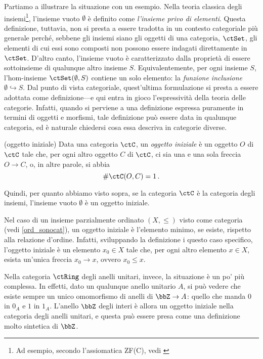 \Todo{}
Partiamo a illustrare la situazione con un esempio. Nella teoria classica degli insiemi\footnote{Ad esempio, secondo l'assiomatica ZF(C), vedi \cite{ZFC}}, l'insieme vuoto \(\emptyset\) è definito come \emph{l'insieme privo di elementi}. Questa definizione, tuttavia, non si presta a essere tradotta in un contesto categoriale più generale perché, sebbene gli insiemi siano gli oggetti di una categoria, \(\ctSet\), gli elementi di cui essi sono composti non possono essere indagati direttamente in \(\ctSet\). D'altro canto, l'insieme vuoto è caratterizzato dalla  proprietà di essere sottoinsieme di qualunque altro insieme \(S\). Equivalentemente, per ogni insieme \(S\), l'hom-insieme \(\Hom\ctSet(\emptyset,S)\) contiene un solo elemento: la  \emph{funzione inclusione}  \(\emptyset \hookrightarrow S\). Dal punto di vista categoriale, quest'ultima formulazione si presta a essere adottata come definizione---e qui entra in gioco l'espressività della teoria delle categorie. Infatti, quando si perviene a una definizione espressa puramente in termini di oggetti e morfismi,  tale definizione può essere data in qualunque categoria, ed è naturale chiedersi cosa essa descriva in categorie diverse. 

\begin{example}(oggetto iniziale)\label{ex_oggetto_iniziale}
	Data una categoria \(\ctC\), un \emph{oggetto iniziale} è un oggetto \(O\) di \(\ctC\) tale che, per ogni altro oggetto \(C\) di \(\ctC\), ci sia una e una sola freccia \(O\to C\), o, in altre parole, si abbia
	\begin{equation}\label{def_oggetto_iniziale}
		\#\Hom\ctC(O,C)=1\,.
	\end{equation}

	Quindi, per quanto abbiamo visto sopra, se la categoria \(\ctC\) è la categoria degli insiemi, l'insieme vuoto \(\emptyset\)  è un oggetto iniziale.

	Nel caso di un insieme parzialmente ordinato \((X, \leqslant)\) visto come categoria (vedi \ref{ord_sonocat}), un oggetto iniziale è l'elemento minimo, se esiste, rispetto alla relazione d'ordine. Infatti, sviluppando la definizione i questo caso specifico, l'oggetto iniziale è un elemento \(x_0\in X\) tale che, per ogni altro elemento \(x\in X\), esista un'unica freccia \(x_0\to x\), ovvero \(x_0\leqslant x\).

	Nella categoria \(\ctRing\) degli anelli unitari, invece, la situazione è un po' più complessa. In effetti, dato un qualunque anello  unitario \(A\), si può vedere che esiste sempre un unico omomorfismo di anelli di \(\bbZ\to A\): quello che manda \(0\) in \(0_A\) e \(1\) in \(1_A\). L'anello \(\bbZ\) degli interi è allora un oggetto iniziale nella categoria degli anelli unitari, e questa può essere presa come una definizione molto sintetica di \(\bbZ\).
\end{example}


